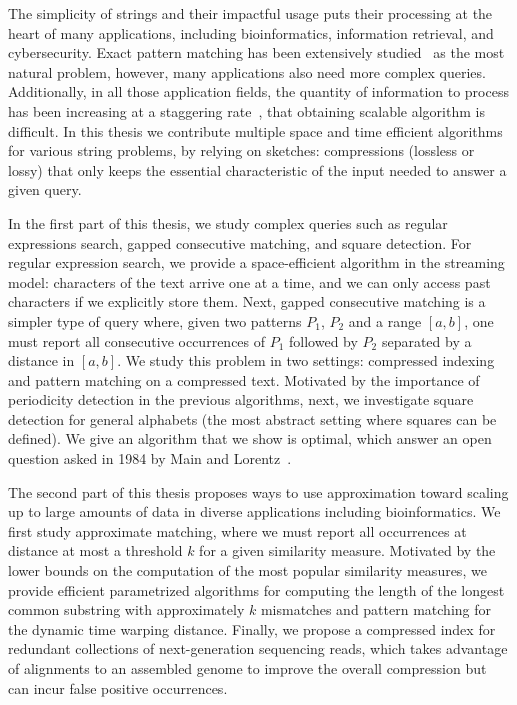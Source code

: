The simplicity of strings and their impactful usage puts their processing at the heart of many applications, including bioinformatics, information retrieval, and cybersecurity. Exact pattern matching has been extensively studied~\cite{charras2004handbook} as the most natural problem, however, many applications also need more complex queries. Additionally, in all those application fields, the quantity of information to process has been increasing at a staggering rate~\cite{muir2016real}, that obtaining scalable algorithm is difficult.
In this thesis we contribute multiple space and time efficient algorithms for various string problems, by relying on sketches: compressions (lossless or lossy) that only keeps the essential characteristic of the input needed to answer a given query.%

In the first part of this thesis, we study complex queries such as regular expressions search, gapped consecutive matching, and square detection. 
For regular expression search, we provide a space-efficient algorithm in the streaming model: characters of the text arrive one at a time, and we can only access past characters if we explicitly store them. 
Next, gapped consecutive matching is a simpler type of query where, given two patterns $P_1$, $P_2$ and a range $[a,b]$, one must report all consecutive occurrences of $P_1$ followed by $P_2$ separated by a distance in $[a,b]$. We study this problem in two settings: compressed indexing and pattern matching on a compressed text.
Motivated by the importance of periodicity detection in the previous algorithms, next, we investigate square detection for general alphabets (the most abstract setting where squares can be defined). We give an algorithm that we show is optimal, which answer an open question asked in 1984 by Main and Lorentz~\cite{Main1984}.



The second part of this thesis proposes ways to use approximation toward scaling up to large amounts of data in diverse applications including bioinformatics.
We first study approximate matching, where we must report all occurrences at distance at most a threshold $k$ for a given similarity measure. Motivated by the lower bounds on the computation of the most popular similarity measures, we provide efficient parametrized algorithms for computing the length of the longest common substring with approximately $k$ mismatches and pattern matching for the dynamic time warping distance.
Finally, we propose a compressed index for redundant collections of next-generation sequencing reads, which takes advantage of alignments to an assembled genome to improve the overall compression but can incur false positive occurrences.

